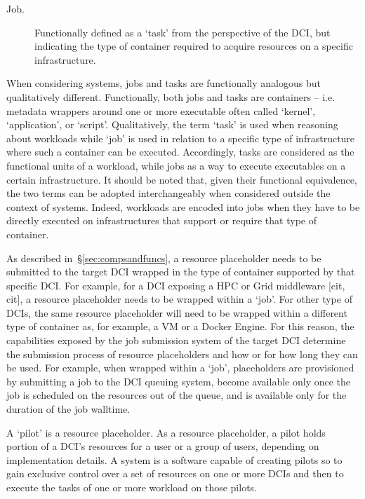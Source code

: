 \documentclass{sig-alternate}
\begin{document}
\begin{description}

\item[Job.] Functionally defined as a `task' from the perspective of the DCI,
but indicating the type of container required to acquire resources on a
specific infrastructure.

\end{description}

When considering \pilot systems, jobs and tasks are functionally analogous but
qualitatively different. Functionally, both jobs and tasks are containers --
i.e. metadata wrappers around one or more executable often called `kernel',
`application', or `script'. Qualitatively, the term `task' is used when
reasoning about workloads while `job' is used in relation to a specific type of
infrastructure where such a container can be executed. Accordingly, tasks are
considered as the functional units of a workload, while jobs as a way to
execute executables on a certain infrastructure. It should be noted that, given
their functional equivalence, the two terms can be adopted interchangeably when
considered outside the context of \pilot systems. Indeed, workloads are encoded
into jobs when they have to be directly executed on infrastructures that
support or require that type of container.

As described in~\S\ref{sec:compsandfuncs}, a resource placeholder needs to be
submitted to the target DCI wrapped in the type of container supported by that
specific DCI. For example, for a DCI exposing a HPC or Grid middleware [cit,
cit], a resource placeholder needs to be wrapped within a `job'. For other type
of DCIs, the same resource placeholder will need to be wrapped within a
different type of container as, for example, a VM or a Docker Engine. For this
reason, the capabilities exposed by the job submission system of the target DCI
determine the submission process of resource placeholders and how or for how
long they can be used. For example, when wrapped within a `job', placeholders
are provisioned by submitting a job to the DCI queuing system, become available
only once the job is scheduled on the resources out of the queue, and is
available only for the duration of the job walltime.

A `pilot' is a resource placeholder. As a resource placeholder, a pilot holds
portion of a DCI's resources for a user or a group of users, depending on
implementation details. A \pilot system is a software capable of creating
pilots so to gain exclusive control over a set of resources on one or more DCIs
and then to execute the tasks of one or more workload on those pilots.
\end{document}

